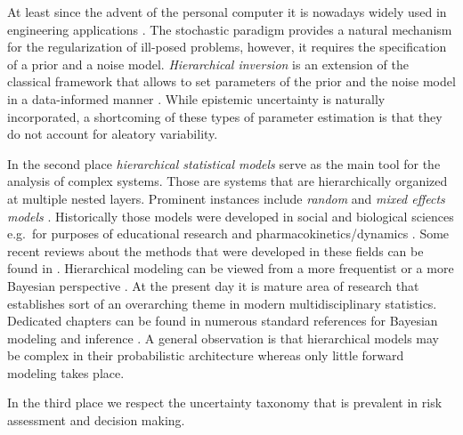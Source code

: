 At least since the advent of the personal computer it is nowadays widely used in engineering applications \cite{Bayesian:Hadidi2008,Bayesian:Beck2010}.
The stochastic paradigm provides a natural mechanism for the regularization of ill-posed problems, however, it requires the specification of a prior and a noise model.
\textit{Hierarchical inversion} is an extension of the classical framework that allows to set parameters of the prior and the noise model in a data-informed manner \cite{Multilevel:Malinverno2004,Inversion:Wang2005:b}.
While epistemic uncertainty is naturally incorporated, a shortcoming of these types of parameter estimation is that they do not account for aleatory variability.
\par %
In the second place \textit{hierarchical statistical models} serve as the main tool for the analysis of complex systems.
Those are systems that are hierarchically organized at multiple nested layers.
Prominent instances include \textit{random} and \textit{mixed effects models} \cite{Multilevel:Wu2010}.
Historically those models were developed in social and biological sciences e.g.\ for purposes of educational research
\cite{Multilevel:Raudenbusch1988,Multilevel:Seltzer1996} and pharmacokinetics/dynamics \cite{Multilevel:Wakefield1996,Multilevel:Banks2004}.
Some recent reviews about the methods that were developed in these fields can be found in \cite{Multilevel:Davidian2003,Multilevel:Banks2012}.
Hierarchical modeling can be viewed from a more frequentist \cite{Multilevel:Davidian1995,Multilevel:Banks2014} or a more Bayesian perspective \cite{Multilevel:Gelman2006:a,Bayesian:Congdon2010}.
At the present day it is mature area of research that establishes sort of an overarching theme in modern multidisciplinary statistics.
Dedicated chapters can be found in numerous standard references for Bayesian modeling and inference \cite{Bayesian:Jackman2009,Bayesian:Gelman2014:3rd}.
A general observation is that hierarchical models may be complex in their probabilistic architecture whereas only little forward modeling takes place.
\par %
In the third place we respect the uncertainty taxonomy that is prevalent in risk assessment and decision making.
